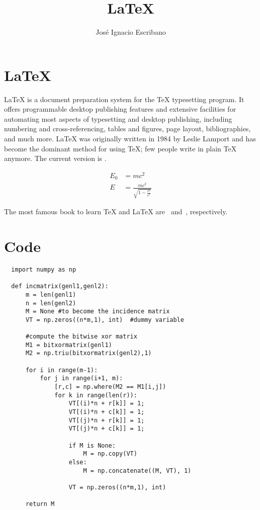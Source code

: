 \documentclass{article}
\title{\LaTeX}
\author{José Ignacio Escribano}
\begin{document}
  \maketitle

  \tableofcontents

  \newpage

  \section{\LaTeX}

  \LaTeX{} is a document preparation system for
  the \TeX{} typesetting program. It offers
  programmable desktop publishing features and
  extensive facilities for automating most
  aspects of typesetting and desktop publishing,
  including numbering and  cross-referencing,
  tables and figures, page layout,
  bibliographies, and much more. \LaTeX{} was
  originally written in 1984 by Leslie Lamport
  and has become the  dominant method for using
  \TeX; few people write in plain \TeX{} anymore.
  The current version is \LaTeXe.

  \begin{align}
    E_0 &= mc^2 \\
    E &= \frac{mc^2}{\sqrt{1-\frac{v^2}{c^2}}}
  \end{align}

  The most famous book to learn \TeX{} and \LaTeX{}
  are~\cite{texbook} and~\cite{latex}, respectively.

  \blindmathtrue
  \blinddocument
  \blindmathpaper

  \section{Code}

  \begin{verbatim}
  import numpy as np

  def incmatrix(genl1,genl2):
      m = len(genl1)
      n = len(genl2)
      M = None #to become the incidence matrix
      VT = np.zeros((n*m,1), int)  #dummy variable

      #compute the bitwise xor matrix
      M1 = bitxormatrix(genl1)
      M2 = np.triu(bitxormatrix(genl2),1)

      for i in range(m-1):
          for j in range(i+1, m):
              [r,c] = np.where(M2 == M1[i,j])
              for k in range(len(r)):
                  VT[(i)*n + r[k]] = 1;
                  VT[(i)*n + c[k]] = 1;
                  VT[(j)*n + r[k]] = 1;
                  VT[(j)*n + c[k]] = 1;

                  if M is None:
                      M = np.copy(VT)
                  else:
                      M = np.concatenate((M, VT), 1)

                  VT = np.zeros((n*m,1), int)

      return M
  \end{verbatim}

  
  
\end{document}

